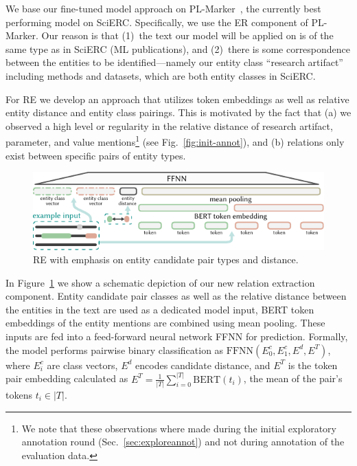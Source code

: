 %


We base our fine-tuned model approach on PL-Marker~\cite{Ye2022}, the currently best performing model on SciERC. Specifically, we use the ER component of PL-Marker. Our reason is that (1)~the text our model will be applied on is of the same type as in SciERC (ML publications), and (2)~there is some correspondence between the entities to be identified---namely our entity class ``research artifact'' including methods and datasets, which are both entity classes in SciERC.

For RE we develop an approach that utilizes token embeddings as well as relative entity distance and entity class pairings. This is motivated by the fact that (a) we observed a high level or regularity in the relative distance of research artifact, parameter, and value mentions\footnote{We note that these observations where made during the initial exploratory annotation round (Sec.~\ref{sec:exploreannot}) and not during annotation of the evaluation data.} (see Fig.~\ref{fig:init-annot}), and (b) relations only exist between specific pairs of entity types.

\begin{figure}[bt]
  \centering
  \includegraphics[width=.8\linewidth]{figures/ref_params/ffnn_re_sub_visual_v2}
  \caption{RE with emphasis on entity candidate pair types and distance.}
  \label{fig:ffnn-re-sub-visual}
\end{figure}

In Figure~\ref{fig:ffnn-re-sub-visual} we show a schematic depiction of our new relation extraction component. Entity candidate pair classes as well as the relative distance between the entities in the text are used as a dedicated model input, BERT token embeddings of the entity mentions are combined using mean pooling. These inputs are fed into a feed-forward neural network FFNN for prediction. Formally, the model performs pairwise binary classification as $\text{FFNN}(E^c_0, E^c_1, E^d, E^T)$, where $E^c_i$ are class vectors, $E^d$ encodes candidate distance, and $E^T$ is the token pair embedding calculated as $E^T=\frac{1}{|T|}\sum^{|T|}_{i=0}\text{BERT}(t_i)$, the mean of the pair's tokens $t_i\in|T|$.

